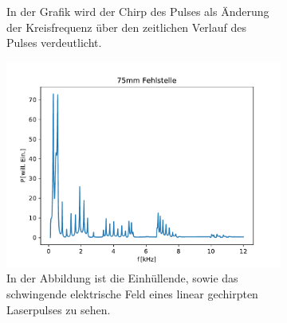 \begin{figure}[ht]
\begin{subfigure}[b]{0.45\textwidth}
                    \caption{In der Grafik wird der Chirp des Pulses als Änderung der Kreisfrequenz über den zeitlichen Verlauf des Pulses verdeutlicht.}
                    \label{fig:1dim_4_Zylinder_625_Fehlstelle}
                \end{subfigure}
                \centering
                \begin{subfigure}[b]{0.45\textwidth}
                    \centering
                    \includegraphics[scale=0.45]{./pictures/1dim_10_Zylinder_750_Fehlstelle.pdf}
                    \caption{In der Abbildung ist die Einhüllende, sowie das schwingende elektrische Feld eines linear gechirpten Laserpulses zu sehen.}
                    \label{fig:1dim_10_Zylinder_750_Fehlstelle}
                \end{subfigure}
                \caption{ }
                \label{fig:Störstelle}
            \end{figure}
            \FloatBarrier

